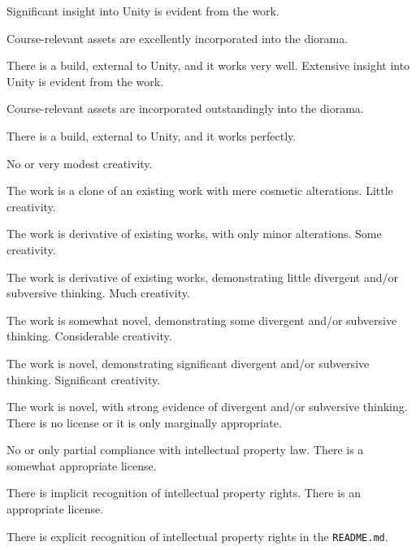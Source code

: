 \documentclass{../../fal_assignment}
\begin{document}
\begin{markingrubric}
        \grade Significant insight into Unity is evident from the work.
            \par Course-relevant assets are excellently incorporated into the diorama.
            \par There is a build, external to Unity, and it works very well.
        \grade Extensive insight into Unity is evident from the work.
            \par Course-relevant assets are incorporated outstandingly into the diorama.
            \par There is a build, external to Unity, and it works perfectly.
%
\end{markingrubric}

\begin{markingrubric}
%
        \grade\fail No or very modest creativity.
            \par The work is a clone of an existing work with mere cosmetic alterations.
        \grade Little creativity.
            \par The work is derivative of existing works, with only minor alterations.
        \grade Some creativity.
            \par The work is derivative of existing works, demonstrating little divergent and/or subversive thinking.
        \grade Much creativity.
            \par The work is somewhat novel, demonstrating some divergent and/or subversive thinking.
        \grade Considerable creativity.
            \par The work is novel, demonstrating significant divergent and/or subversive thinking.
        \grade Significant creativity.
            \par The work is novel, with strong evidence of divergent and/or subversive thinking.
%
        \grade\fail There is no license or it is only marginally appropriate.
                 \par No or only partial compliance with intellectual property law.
        \grade There is a somewhat appropriate license.
            \par There is implicit recognition of intellectual property rights.
        \grade There is an appropriate license. 
            \par There is explicit recognition of intellectual property rights in the \texttt{README.md}.

\end{markingrubric}
\end{document}
